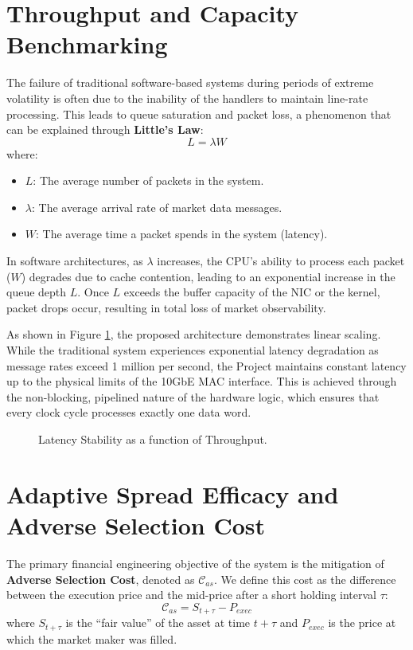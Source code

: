 \section{Throughput and Capacity Benchmarking}
The failure of traditional software-based systems during periods of extreme volatility is often due to the inability of the handlers to maintain line-rate processing. This leads to queue saturation and packet loss, a phenomenon that can be explained through \textbf{Little's Law}:
\begin{equation}
    L = \lambda W
\end{equation}
where:
\begin{itemize}
    \item $L$: The average number of packets in the system.
    \item $\lambda$: The average arrival rate of market data messages.
    \item $W$: The average time a packet spends in the system (latency).
\end{itemize}

In software architectures, as $\lambda$ increases, the CPU's ability to process each packet ($W$) degrades due to cache contention, leading to an exponential increase in the queue depth $L$. Once $L$ exceeds the buffer capacity of the NIC or the kernel, packet drops occur, resulting in total loss of market observability.

As shown in Figure \ref{fig:throughput_bench_ch8}, the proposed architecture demonstrates linear scaling. While the traditional system experiences exponential latency degradation as message rates exceed 1 million per second, the Project maintains constant latency up to the physical limits of the 10GbE MAC interface. This is achieved through the non-blocking, pipelined nature of the hardware logic, which ensures that every clock cycle processes exactly one data word.

\begin{figure}
    \centering
    
    \caption{Latency Stability as a function of Throughput.}
    \label{fig:throughput_bench_ch8}
\end{figure}
\clearpage

\section{Adaptive Spread Efficacy and Adverse Selection Cost}
The primary financial engineering objective of the system is the mitigation of \textbf{Adverse Selection Cost}, denoted as $\mathcal{C}_{as}$. We define this cost as the difference between the execution price and the mid-price after a short holding interval $\tau$:
\begin{equation}
    \mathcal{C}_{as} = S_{t+\tau} - P_{exec}
\end{equation}
where $S_{t+\tau}$ is the ``fair value'' of the asset at time $t+\tau$ and $P_{exec}$ is the price at which the market maker was filled.


